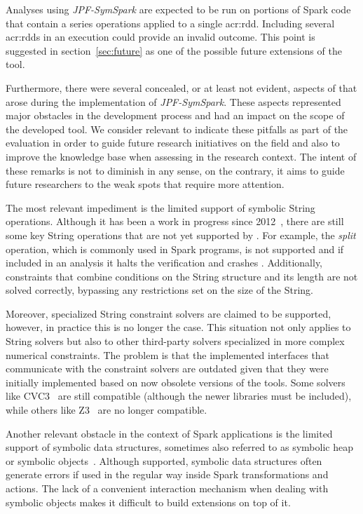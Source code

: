 Analyses using \textit{JPF-SymSpark} are expected to be run on portions of Spark code that contain a series operations applied to a single \acrshort{acr:rdd}. Including several \acrshort{acr:rdd}s in an execution could provide an invalid outcome. This point is suggested in section~\ref{sec:future} as one of the possible future extensions of the tool.

Furthermore, there were several concealed, or at least not evident, aspects of \spf{} that arose during the implementation of \textit{JPF-SymSpark}. These aspects represented major obstacles in the development process and had an impact on the scope of the developed tool. We consider relevant to indicate these pitfalls as part of the evaluation in order to guide future research initiatives on the field and also to improve the knowledge base when assessing \spf{} in the research context. The intent of these remarks is not to diminish \spf{} in any sense, on the contrary, it aims to guide future researchers to the weak spots that require more attention.

The most relevant impediment is the limited support of symbolic String operations. Although it has been a work in progress since 2012~\cite{Redelinghuys2012,Pasareanu2013}, there are still some key String operations that are not yet supported by \spf{}. For example, the \textit{split} operation, which is commonly used in Spark programs, is not supported and if included in an analysis it halts the verification and crashes \jpf{}. Additionally, constraints that combine conditions on the String structure and its length are not solved correctly, bypassing any restrictions set on the size of the String.

Moreover, specialized String constraint solvers are claimed to be supported, however, in practice this is no longer the case. This situation not only applies to String solvers but also to other third-party solvers specialized in more complex numerical constraints. The problem is that the implemented interfaces that communicate with the constraint solvers are outdated given that they were initially implemented based on now obsolete versions of the tools. Some solvers like CVC3~\cite{Barrett2007} are still compatible (although the newer libraries must be included), while others like Z3~\cite{DeMoura2008} are no longer compatible.

Another relevant obstacle in the context of Spark applications is the limited support of symbolic data structures, sometimes also referred to as symbolic heap or symbolic objects~\cite{Pasareanu2010}. Although supported, symbolic data structures often generate errors if used in the regular way inside Spark transformations and actions. The lack of a convenient interaction mechanism when dealing with symbolic objects makes it difficult to build extensions on top of it.

